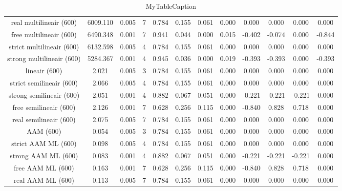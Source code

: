 \begin{table}
\centering
\begin{tabular}{|c|c|c|c|c|c|c|c|c|c|c|c|}
\hline
 &  &  &  &  &  &  &  &  &  &  &  \\
\hline
real multilineair (600) & 6009.110 & 0.005 & 7 & 0.784 & 0.155 & 0.061 & 0.000 & 0.000 & 0.000 & 0.000 & 0.000 \\
\hline
free multilineair (600) & 6490.348 & 0.001 & 7 & 0.941 & 0.044 & 0.000 & 0.015 & -0.402 & -0.074 & 0.000 & -0.844 \\
\hline
strict multilineair (600) & 6132.598 & 0.005 & 4 & 0.784 & 0.155 & 0.061 & 0.000 & 0.000 & 0.000 & 0.000 & 0.000 \\
\hline
strong multilineair (600) & 5284.367 & 0.001 & 4 & 0.945 & 0.036 & 0.000 & 0.019 & -0.393 & -0.393 & 0.000 & -0.393 \\
\hline
lineair (600) & 2.021 & 0.005 & 3 & 0.784 & 0.155 & 0.061 & 0.000 & 0.000 & 0.000 & 0.000 & 0.000 \\
\hline
strict semilineair (600) & 2.066 & 0.005 & 4 & 0.784 & 0.155 & 0.061 & 0.000 & 0.000 & 0.000 & 0.000 & 0.000 \\
\hline
strong semilineair (600) & 2.051 & 0.001 & 4 & 0.882 & 0.067 & 0.051 & 0.000 & -0.221 & -0.221 & -0.221 & 0.000 \\
\hline
free semilineair (600) & 2.126 & 0.001 & 7 & 0.628 & 0.256 & 0.115 & 0.000 & -0.840 & 0.828 & 0.718 & 0.000 \\
\hline
real semilineair (600) & 2.075 & 0.005 & 7 & 0.784 & 0.155 & 0.061 & 0.000 & 0.000 & 0.000 & 0.000 & 0.000 \\
\hline
AAM (600) & 0.054 & 0.005 & 3 & 0.784 & 0.155 & 0.061 & 0.000 & 0.000 & 0.000 & 0.000 & 0.000 \\
\hline
strict AAM ML (600) & 0.098 & 0.005 & 4 & 0.784 & 0.155 & 0.061 & 0.000 & 0.000 & 0.000 & 0.000 & 0.000 \\
\hline
strong AAM ML (600) & 0.083 & 0.001 & 4 & 0.882 & 0.067 & 0.051 & 0.000 & -0.221 & -0.221 & -0.221 & 0.000 \\
\hline
free AAM ML (600) & 0.163 & 0.001 & 7 & 0.628 & 0.256 & 0.115 & 0.000 & -0.840 & 0.828 & 0.718 & 0.000 \\
\hline
real AAM ML (600) & 0.113 & 0.005 & 7 & 0.784 & 0.155 & 0.061 & 0.000 & 0.000 & 0.000 & 0.000 & 0.000 \\
\hline
\end{tabular}
\caption{MyTableCaption}
\label{table:MyTableLabel}
\end{table}
